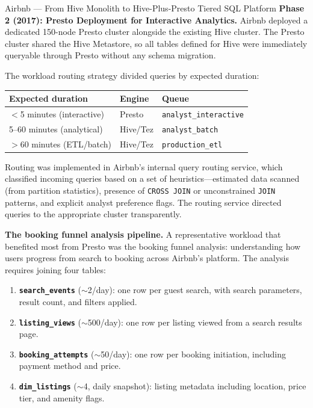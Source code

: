 \begin{casestudy}{Airbnb --- From Hive Monolith to Hive-Plus-Presto Tiered SQL Platform}
\smallskip
\textbf{Phase 2 (2017): Presto Deployment for Interactive Analytics.}
Airbnb deployed a dedicated 150-node Presto cluster alongside the
existing Hive cluster. The Presto cluster shared the Hive Metastore,
so all tables defined for Hive were immediately queryable through Presto
without any schema migration.

The workload routing strategy divided queries by expected duration:
\begin{center}
\begin{tabular}{lll}
\toprule
\textbf{Expected duration} & \textbf{Engine} & \textbf{Queue} \\
\midrule
$<$5 minutes (interactive) & Presto & \texttt{analyst\_interactive} \\
5--60 minutes (analytical) & Hive/Tez & \texttt{analyst\_batch} \\
$>$60 minutes (ETL/batch)  & Hive/Tez & \texttt{production\_etl} \\
\bottomrule
\end{tabular}
\end{center}

Routing was implemented in Airbnb's internal query routing service,
which classified incoming queries based on a set of heuristics---estimated
data scanned (from partition statistics), presence of \texttt{CROSS JOIN}
or unconstrained \texttt{JOIN} patterns, and explicit analyst preference
flags. The routing service directed queries to the appropriate cluster
transparently.

\smallskip
\textbf{The booking funnel analysis pipeline.}
A representative workload that benefited most from Presto was the
booking funnel analysis: understanding how users progress from search
to booking across Airbnb's platform. The analysis requires joining four
tables:

\begin{enumerate}
  \item \textbf{\texttt{search\_events}} ($\sim$2\TB/day): one row
        per guest search, with search parameters, result count, and
        filters applied.
  \item \textbf{\texttt{listing\_views}} ($\sim$500\GB/day): one row
        per listing viewed from a search results page.
  \item \textbf{\texttt{booking\_attempts}} ($\sim$50\GB/day): one row
        per booking initiation, including payment method and price.
  \item \textbf{\texttt{dim\_listings}} ($\sim$4\GB, daily snapshot):
        listing metadata including location, price tier, and amenity flags.
\end{enumerate}


\end{casestudy}

